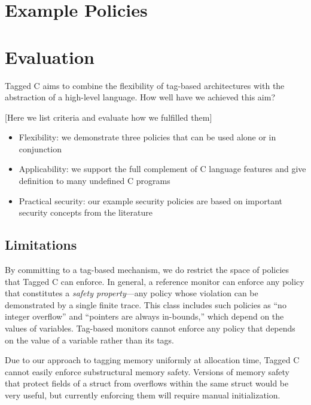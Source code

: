 \documentclass{llncs}
\begin{document}
\section{Example Policies}
\label{sec:policies}

\section{Evaluation}
\label{sec:evaluation}

Tagged C aims to combine the flexibility of tag-based architectures with the abstraction
of a high-level language. How well have we achieved this aim?

[Here we list criteria and evaluate how we fulfilled them]

\begin{itemize}
\item Flexibility: we demonstrate three policies that can be used alone or in conjunction
\item Applicability: we support the full complement of C language features and give definition
  to many undefined C programs
\item Practical security: our example security policies are based on important security concepts
  from the literature
\end{itemize}

\subsection{Limitations}

By committing to a tag-based mechanism, we do restrict the space of policies that Tagged C
can enforce. In general, a reference monitor can enforce any policy that constitutes a
{\em safety property}---any policy whose violation can be demonstrated by a single finite
trace. This class includes such policies as ``no integer overflow'' and ``pointers are always in-bounds,''
which depend on the values of variables. Tag-based monitors cannot enforce any policy that
depends on the value of a variable rather than its tags. 


Due to our approach to tagging memory uniformly at allocation time, Tagged C cannot easily
enforce substructural memory safety. Versions of memory safety that protect fields of a
struct from overflows within the same struct would be very useful, but currently enforcing
them will require manual initialization.
\end{document}
